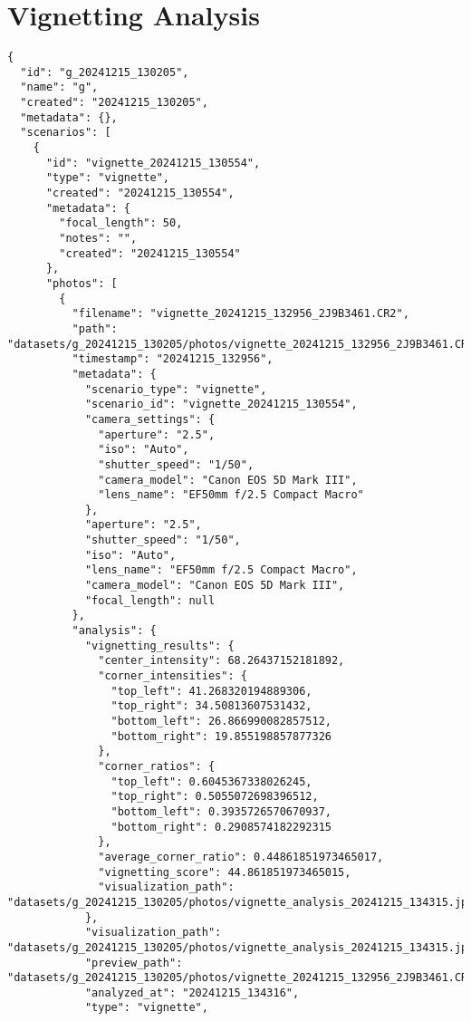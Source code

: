 \section{Vignetting Analysis}
\label{app:vignetting_json}
\begin{verbatim}
{
  "id": "g_20241215_130205",
  "name": "g",
  "created": "20241215_130205",
  "metadata": {},
  "scenarios": [
    {
      "id": "vignette_20241215_130554",
      "type": "vignette",
      "created": "20241215_130554",
      "metadata": {
        "focal_length": 50,
        "notes": "",
        "created": "20241215_130554"
      },
      "photos": [
        {
          "filename": "vignette_20241215_132956_2J9B3461.CR2",
          "path": "datasets/g_20241215_130205/photos/vignette_20241215_132956_2J9B3461.CR2",
          "timestamp": "20241215_132956",
          "metadata": {
            "scenario_type": "vignette",
            "scenario_id": "vignette_20241215_130554",
            "camera_settings": {
              "aperture": "2.5",
              "iso": "Auto",
              "shutter_speed": "1/50",
              "camera_model": "Canon EOS 5D Mark III",
              "lens_name": "EF50mm f/2.5 Compact Macro"
            },
            "aperture": "2.5",
            "shutter_speed": "1/50",
            "iso": "Auto",
            "lens_name": "EF50mm f/2.5 Compact Macro",
            "camera_model": "Canon EOS 5D Mark III",
            "focal_length": null
          },
          "analysis": {
            "vignetting_results": {
              "center_intensity": 68.26437152181892,
              "corner_intensities": {
                "top_left": 41.268320194889306,
                "top_right": 34.50813607531432,
                "bottom_left": 26.866990082857512,
                "bottom_right": 19.855198857877326
              },
              "corner_ratios": {
                "top_left": 0.6045367338026245,
                "top_right": 0.5055072698396512,
                "bottom_left": 0.3935726570670937,
                "bottom_right": 0.2908574182292315
              },
              "average_corner_ratio": 0.44861851973465017,
              "vignetting_score": 44.861851973465015,
              "visualization_path": "datasets/g_20241215_130205/photos/vignette_analysis_20241215_134315.jpg"
            },
            "visualization_path": "datasets/g_20241215_130205/photos/vignette_analysis_20241215_134315.jpg",
            "preview_path": "datasets/g_20241215_130205/photos/vignette_20241215_132956_2J9B3461.CR2",
            "analyzed_at": "20241215_134316",
            "type": "vignette",

\end{verbatim}

